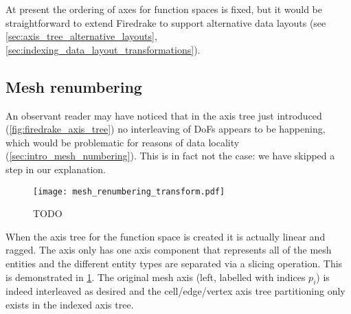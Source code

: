 \documentclass[thesis]{subfiles}
\begin{document}
At present the ordering of axes for function spaces is fixed, but it would be straightforward to extend Firedrake to support alternative data layouts (see \cref{sec:axis_tree_alternative_layouts}, \cref{sec:indexing_data_layout_transformations}).

\subsection{Mesh renumbering}

An observant reader may have noticed that in the axis tree just introduced (\cref{fig:firedrake_axis_tree}) no interleaving of DoFs appears to be happening, which would be problematic for reasons of data locality (\cref{sec:intro_mesh_numbering}).
This is in fact not the case: we have skipped a step in our explanation.

\begin{figure}
  \centering
  \texttt{[image: mesh\_renumbering\_transform.pdf]}
  \caption{TODO}
  \label{fig:mesh_renumbering_transform}
\end{figure}

When the axis tree for the function space is created it is actually linear and ragged.
The  axis only has one axis component that represents all of the mesh entities and the different entity types are separated via a slicing operation.
This is demonstrated in \cref{fig:mesh_renumbering_transform}.
The original mesh axis (left, labelled with indices $p_i$) is indeed interleaved as desired and the cell/edge/vertex axis tree partitioning only exists in the indexed axis tree.
\end{document}
